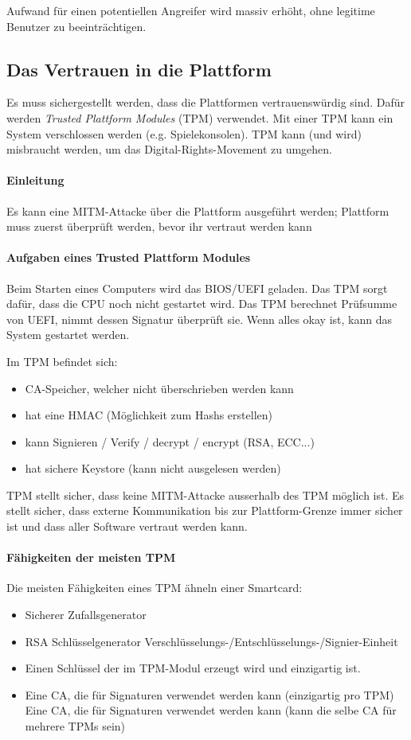 \documentclass[a4paper,12pt]{article}
\begin{document}
Aufwand für einen potentiellen Angreifer wird massiv erhöht, ohne legitime Benutzer zu beeinträchtigen.

\subsection{Das Vertrauen in die Plattform}
Es muss sichergestellt werden, dass die Plattformen vertrauenswürdig sind. Dafür werden \emph{Trusted Plattform Modules} (TPM) verwendet. Mit einer TPM kann ein System verschlossen werden (e.g. Spielekonsolen). TPM kann (und wird) misbraucht werden, um das Digital-Rights-Movement zu umgehen.

\paragraph{Einleitung}
Es kann eine MITM-Attacke über die Plattform ausgeführt werden; Plattform muss zuerst überprüft werden, bevor ihr vertraut werden kann

\paragraph{Aufgaben eines Trusted Plattform Modules}
Beim Starten eines Computers wird das BIOS/UEFI geladen. Das TPM sorgt dafür, dass die CPU noch nicht gestartet wird. Das TPM berechnet Prüfsumme von UEFI, nimmt dessen Signatur überprüft sie. Wenn alles okay ist, kann das System gestartet werden.

Im TPM befindet sich:
\begin{itemize}
\item CA-Speicher, welcher nicht überschrieben werden kann
\item hat eine HMAC (Möglichkeit zum Hashs erstellen)
\item kann Signieren / Verify / decrypt / encrypt (RSA, ECC...)
\item hat sichere Keystore (kann nicht ausgelesen werden)
\end{itemize}

TPM stellt sicher, dass keine MITM-Attacke ausserhalb des TPM möglich ist. Es stellt sicher, dass externe Kommunikation bis zur Plattform-Grenze immer sicher ist und dass aller Software vertraut werden kann.

\paragraph{Fähigkeiten der meisten TPM}
Die meisten Fähigkeiten eines TPM ähneln einer Smartcard:
\begin{itemize}
\item Sicherer Zufallsgenerator
\item RSA Schlüsselgenerator Verschlüsselungs-/Entschlüsselungs-/Signier-Einheit
\item Einen Schlüssel der im TPM-Modul erzeugt wird und einzigartig ist.
\item Eine CA, die für Signaturen verwendet werden kann (einzigartig pro TPM) Eine CA, die für Signaturen verwendet werden kann (kann die selbe CA für mehrere TPMs sein)
\end{itemize}
\end{document}
